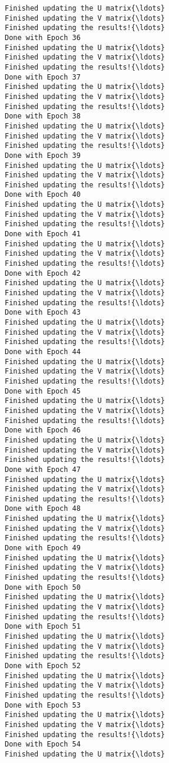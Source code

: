 \documentclass{article}
\begin{document}
\begin{Verbatim}[commandchars=\\\{\}]
Finished updating the U matrix{\ldots}
Finished updating the V matrix{\ldots}
Finished updating the results!{\ldots}
Done with Epoch 36
Finished updating the U matrix{\ldots}
Finished updating the V matrix{\ldots}
Finished updating the results!{\ldots}
Done with Epoch 37
Finished updating the U matrix{\ldots}
Finished updating the V matrix{\ldots}
Finished updating the results!{\ldots}
Done with Epoch 38
Finished updating the U matrix{\ldots}
Finished updating the V matrix{\ldots}
Finished updating the results!{\ldots}
Done with Epoch 39
Finished updating the U matrix{\ldots}
Finished updating the V matrix{\ldots}
Finished updating the results!{\ldots}
Done with Epoch 40
Finished updating the U matrix{\ldots}
Finished updating the V matrix{\ldots}
Finished updating the results!{\ldots}
Done with Epoch 41
Finished updating the U matrix{\ldots}
Finished updating the V matrix{\ldots}
Finished updating the results!{\ldots}
Done with Epoch 42
Finished updating the U matrix{\ldots}
Finished updating the V matrix{\ldots}
Finished updating the results!{\ldots}
Done with Epoch 43
Finished updating the U matrix{\ldots}
Finished updating the V matrix{\ldots}
Finished updating the results!{\ldots}
Done with Epoch 44
Finished updating the U matrix{\ldots}
Finished updating the V matrix{\ldots}
Finished updating the results!{\ldots}
Done with Epoch 45
Finished updating the U matrix{\ldots}
Finished updating the V matrix{\ldots}
Finished updating the results!{\ldots}
Done with Epoch 46
Finished updating the U matrix{\ldots}
Finished updating the V matrix{\ldots}
Finished updating the results!{\ldots}
Done with Epoch 47
Finished updating the U matrix{\ldots}
Finished updating the V matrix{\ldots}
Finished updating the results!{\ldots}
Done with Epoch 48
Finished updating the U matrix{\ldots}
Finished updating the V matrix{\ldots}
Finished updating the results!{\ldots}
Done with Epoch 49
Finished updating the U matrix{\ldots}
Finished updating the V matrix{\ldots}
Finished updating the results!{\ldots}
Done with Epoch 50
Finished updating the U matrix{\ldots}
Finished updating the V matrix{\ldots}
Finished updating the results!{\ldots}
Done with Epoch 51
Finished updating the U matrix{\ldots}
Finished updating the V matrix{\ldots}
Finished updating the results!{\ldots}
Done with Epoch 52
Finished updating the U matrix{\ldots}
Finished updating the V matrix{\ldots}
Finished updating the results!{\ldots}
Done with Epoch 53
Finished updating the U matrix{\ldots}
Finished updating the V matrix{\ldots}
Finished updating the results!{\ldots}
Done with Epoch 54
Finished updating the U matrix{\ldots}

\end{Verbatim}
\end{document}
